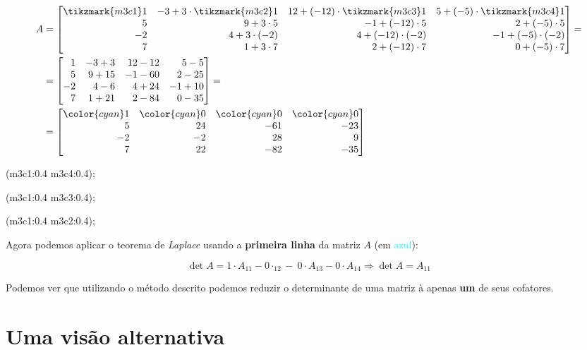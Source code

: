 \begin{align*}
    A&=\begin{bmatrix*}[r]
        \tikzmark{m3c1}1 & -3+3\cdot\tikzmark{m3c2}1 & 12+(-12)\cdot\tikzmark{m3c3}1 & 5+(-5)\cdot\tikzmark{m3c4}1\\
        5 & 9+3\cdot5 & -1+(-12)\cdot5 & 2+(-5)\cdot5\\
        -2 & 4+3\cdot(-2) & 4+(-12)\cdot(-2) & -1+(-5)\cdot(-2)\\
        7 & 1+3\cdot7 & 2+(-12)\cdot7 & 0+(-5)\cdot7
    \end{bmatrix*}=\\
     &=\begin{bmatrix*}[r]
        1 & -3+3 & 12-12 & 5-5\\
        5 & 9+15 & -1-60 & 2-25\\
        -2 & 4-6 & 4+24 & -1+10\\
        7 & 1+21 & 2-84 & 0-35
    \end{bmatrix*}= \\
     &=\begin{bmatrix*}[r]
        \color{cyan}1 & \color{cyan}0 & \color{cyan}0 & \color{cyan}0\\
        5 & 24 & -61 & -23\\
        -2 & -2 & 28 & 9\\
        7 & 22 & -82 & -35
    \end{bmatrix*}
\end{align*}

\begin{tikzoverlay}
     (m3c1:0.4 m3c4:0.4);
    
     (m3c1:0.4 m3c3:0.4);
    
     (m3c1:0.4 m3c2:0.4);
\end{tikzoverlay}

Agora podemos aplicar o teorema de \textit{Laplace} usando a \textbf{primeira linha} da matriz $A$ (em \textcolor{cyan}{azul}):

$$
\det A=1\cdot A_{11} - 0\cdot_{12} - ~0\cdot A_{13} - 0\cdot A_{14} \Rightarrow \det A=A_{11}
$$

Podemos ver que utilizando o método descrito podemos reduzir o determinante de uma matriz à apenas \textbf{um} de seus cofatores.

\section{Uma visão alternativa}

